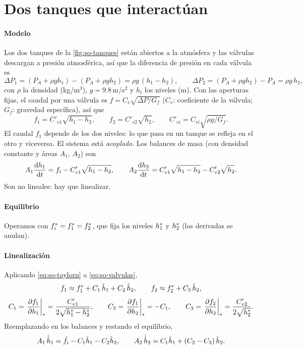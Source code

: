 \section{Dos tanques que interactúan}
\label{sec:so-tanques}

\paragraph{Modelo} Los dos tanques de la \cref{fig:so-tanques} están abiertos a la atmósfera y las válvulas descargan a presión atmosférica, así que la diferencia de presión en cada válvula es
\[
  \Delta P_1=(P_A+\rho g h_1)-(P_A+\rho g h_2)=\rho g\,(h_1-h_2),\qquad
  \Delta P_2=(P_A+\rho g h_2)-P_A=\rho g\,h_2,
\]
con $\rho$ la densidad (kg/m$^3$), $g=9.8$\,m/s$^2$ y $h_i$ los niveles (m). Con las aperturas fijas, el caudal por una válvula es $f=C_v\sqrt{\Delta P/G_f}$ ($C_v$: coeficiente de la válvula; $G_f$: gravedad específica), así que
\begin{equation}
  f_1=C'_{v1}\sqrt{h_1-h_2},\qquad f_2=C'_{v2}\sqrt{h_2},\qquad C'_{vi}=C_{vi}\sqrt{\rho g/G_f}.
  \label{eq:so-valvulas}
\end{equation}
El caudal $f_1$ depende de los dos niveles: lo que pasa en un tanque se refleja en el otro y viceversa. El sistema está \emph{acoplado}. Los balances de masa (con densidad constante y áreas $A_1$, $A_2$) son
\begin{equation}
  A_1\frac{\mathrm{d} h_1}{\mathrm{d} t}=f_i-C'_{v1}\sqrt{h_1-h_2},\qquad
  A_2\frac{\mathrm{d} h_2}{\mathrm{d} t}=C'_{v1}\sqrt{h_1-h_2}-C'_{v2}\sqrt{h_2}.
  \label{eq:so-tanques-nl}
\end{equation}
Son no lineales: hay que linealizar.

\paragraph{Equilibrio} Operamos con $f_i^{*}=f_1^{*}=f_2^{*}$, que fija los niveles $h_1^{*}$ y $h_2^{*}$ (las derivadas se anulan).

\paragraph{Linealización} Aplicando \eqref{eq:so-taylorn} a \eqref{eq:so-valvulas},
\[
  f_1\approx f_1^{*}+C_1\,\hat{h}_1+C_2\,\hat{h}_2,\qquad f_2\approx f_2^{*}+C_3\,\hat{h}_2,
\]
\begin{equation}
  C_1=\left.\frac{\partial f_1}{\partial h_1}\right|_\ast=\frac{C'_{v1}}{2\sqrt{h_1^{*}-h_2^{*}}},\qquad
  C_2=\left.\frac{\partial f_1}{\partial h_2}\right|_\ast=-C_1,\qquad
  C_3=\left.\frac{\partial f_2}{\partial h_2}\right|_\ast=\frac{C'_{v2}}{2\sqrt{h_2^{*}}}.
  \label{eq:so-coeficientes}
\end{equation}
Reemplazando en los balances y restando el equilibrio,
\[
  A_1\,\dot{\hat{h}}_1=\hat{f}_i-C_1\hat{h}_1-C_2\hat{h}_2,\qquad
  A_2\,\dot{\hat{h}}_2=C_1\hat{h}_1+(C_2-C_3)\,\hat{h}_2.
\]

